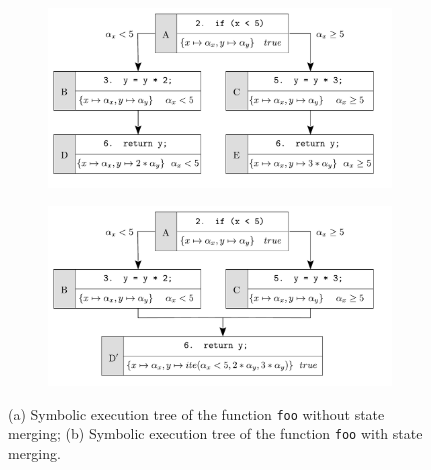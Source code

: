 \begin{figure}[t]
  \vspace{-3mm}
  \centering
  \begin{subfigure}{.5\textwidth}
    \centering
    \hspace{-5mm}
    \includegraphics[width=1.05\columnwidth]{images/state-merging} 
    \caption{}
  \end{subfigure}%
  \begin{subfigure}{.5\textwidth}
    \centering
    \includegraphics[width=1.05\columnwidth]{images/state-merging-2} 
    \caption{}
  \end{subfigure}
  \caption{(a) Symbolic execution tree of the function {\tt foo} without state merging; (b) Symbolic execution tree of the function {\tt foo} with state merging.}
  \label{fig:example-state-merging}
\end{figure}


